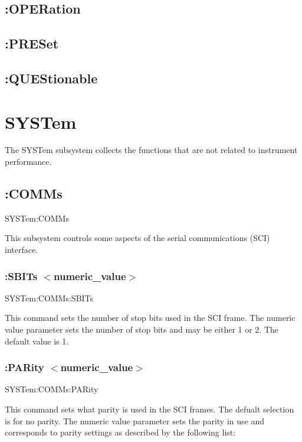 \hypertarget{a00002_statoper}{}\subsection{\-:\-O\-P\-E\-Ration}\label{a00002_statoper}
\hypertarget{a00002_statpres}{}\subsection{\-:\-P\-R\-E\-Set}\label{a00002_statpres}
\hypertarget{a00002_statques}{}\subsection{\-:\-Q\-U\-E\-Stionable}\label{a00002_statques}
\hypertarget{a00002_syst}{}\section{S\-Y\-S\-Tem}\label{a00002_syst}
The S\-Y\-S\-Tem subsystem collects the functions that are not related to instrument performance.\hypertarget{a00002_systcomm}{}\subsection{\-:\-C\-O\-M\-Ms}\label{a00002_systcomm}
{\ttfamily S\-Y\-S\-Tem\-:C\-O\-M\-Ms}\par
 This subsystem controls some aspects of the serial communications (S\-C\-I) interface.\hypertarget{a00002_systcommsbit}{}\subsubsection{\-:\-S\-B\-I\-Ts $<$numeric\-\_\-value$>$}\label{a00002_systcommsbit}
{\ttfamily S\-Y\-S\-Tem\-:\-C\-O\-M\-Ms\-:S\-B\-I\-Ts}\par
 This command sets the number of stop bits used in the S\-C\-I frame. The numeric value parameter sets the number of stop bits and may be either 1 or 2. The default value is 1.\hypertarget{a00002_systcommpar}{}\subsubsection{\-:\-P\-A\-Rity $<$numeric\-\_\-value$>$}\label{a00002_systcommpar}
{\ttfamily S\-Y\-S\-Tem\-:\-C\-O\-M\-Ms\-:P\-A\-Rity}\par
 This command sets what parity is used in the S\-C\-I frames. The defualt selection is for no parity. The numeric value parameter sets the parity in use and corresponds to parity settings as described by the following list\-:

